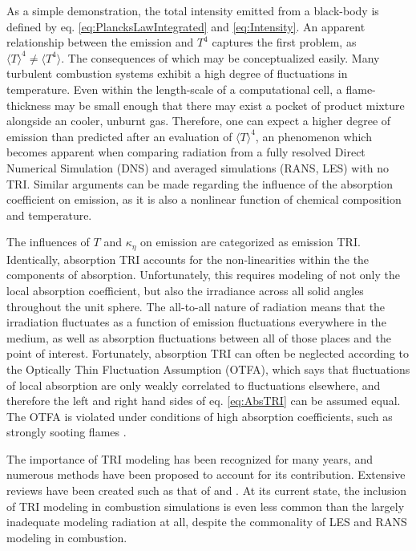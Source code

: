 As a simple demonstration, the total intensity emitted from a black-body is defined by eq. \ref{eq:PlancksLawIntegrated} and \ref{eq:Intensity}.
An apparent relationship between the emission and $T^4$ captures the first problem, as $\langle{T}\rangle^4 \neq \langle{}T^4\rangle$. 
The consequences of which may be conceptualized easily. Many turbulent combustion systems exhibit a high degree of fluctuations in temperature. Even within the length-scale of a computational cell, a flame-thickness may be small enough that there may exist a pocket of product mixture alongside an cooler, unburnt gas.
Therefore, one can expect a higher degree of emission than predicted after an evaluation of $\langle{T}\rangle^4$, an phenomenon which becomes apparent when comparing radiation from a fully resolved Direct Numerical Simulation (DNS) and averaged simulations (RANS, LES) with no TRI.
Similar arguments can be made regarding the influence of the absorption coefficient on emission, as it is also a nonlinear function of chemical composition and temperature.

The influences of $T$ and $\kappa{}_\eta{}$ on emission are categorized as emission TRI. Identically, absorption TRI accounts for the non-linearities within the the components of absorption. Unfortunately, this requires modeling of not only the local absorption coefficient, but also the irradiance across all solid angles throughout the unit sphere.
The all-to-all nature of radiation means that the irradiation fluctuates as a function of emission fluctuations everywhere in the medium, as well as absorption fluctuations between all of those places and the point of interest. Fortunately, absorption TRI can often be neglected according to the Optically Thin Fluctuation Assumption (OTFA), which says that fluctuations of local absorption are only weakly correlated to fluctuations elsewhere, and therefore the left and right hand sides of eq. \ref{eq:AbsTRI} can be assumed equal.
The OTFA is violated under conditions of high absorption coefficients, such as strongly sooting flames \cite{Modest2016RadiativeSystems}.

The importance of TRI modeling has been recognized for many years, and numerous methods have been proposed to account for its contribution. Extensive reviews have been created such as that of \citet{Modest2016RadiativeSystems} and \citet{Coelho2018RadiativeSystems}. 
At its current state, the inclusion of TRI modeling in combustion simulations is even less common than the largely inadequate modeling radiation at all, despite the commonality of LES and RANS modeling in combustion.

